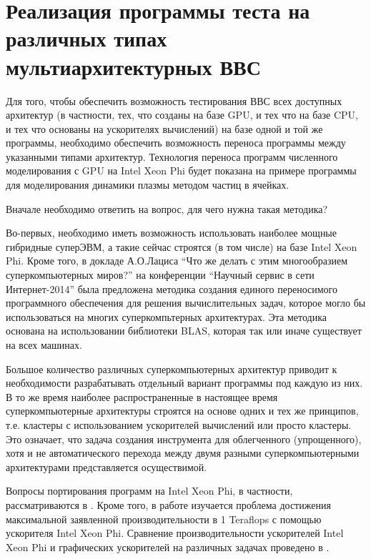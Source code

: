 \section{Реализация программы теста на различных типах мультиархитектурных ВВС}

Для того, чтобы обеспечить возможность тестирования ВВС всех доступных архитектур (в частности, тех, что созданы на базе GPU, и тех что на базе CPU, и тех что основаны на ускорителях вычислений) на базе одной и той же программы, необходимо обеспечить возможность переноса программы между указанными типами архитектур.
Технология переноса программ численного моделирования с GPU на Intel Xeon Phi
будет показана на примере программы для моделирования динамики плазмы методом частиц в ячейках.

Вначале необходимо ответить на вопрос, для чего нужна такая методика?

Во-первых, необходимо иметь возможность использовать наиболее мощные гибридные суперЭВМ, а такие сейчас строятся (в том числе) на базе Intel Xeon Phi. Кроме того, в
докладе А.О.Лациса “Что же делать с этим многообразием суперкомпьютерных миров?” на конференции “Научный сервис в сети Интернет-2014” \cite{Lacis2014} была предложена методика создания единого переносимого программного обеспечения для решения вычислительных задач, которое могло бы использоваться на многих суперкомпьтерных архитектурах. Эта методика основана на использовании библиотеки BLAS, которая так или иначе существует на всех машинах.

Большое количество различных суперкомпьютерных архитектур приводит к необходимости разрабатывать отдельный вариант программы под каждую из них.
В то же время наиболее распространенные в настоящее время суперкомпьютерные архитектуры строятся на основе одних и тех же принципов, т.е. кластеры с использованием ускорителей вычислений или просто кластеры.
Это означает, что задача создания инструмента для облегченного (упрощенного), хотя и не автоматического перехода между двумя разными  суперкомпьютерными архитектурами
представляется осуществимой.

Вопросы портирования программ на Intel Xeon Phi, в частности, рассматриваются в \cite{Rosales2Phi}. Кроме того, в работе \cite{Nakashima2015} изучается проблема достижения максимальной заявленной производительности в 1 Teraflops с помощью ускорителя Intel Xeon Phi. Сравнение производительности ускорителей Intel Xeon Phi и графических ускорителей на различных задачах проведено в \cite{Lyakh201584,Liu2015230,Bernaschi20142495}.

